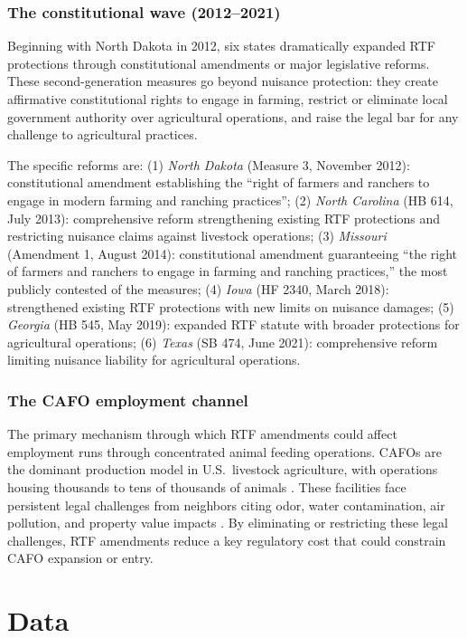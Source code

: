 \documentclass[12pt]{article}
\begin{document}
\subsubsection*{The constitutional wave (2012--2021)} Beginning with North Dakota in 2012, six states dramatically expanded RTF protections through constitutional amendments or major legislative reforms. These second-generation measures go beyond nuisance protection: they create affirmative constitutional rights to engage in farming, restrict or eliminate local government authority over agricultural operations, and raise the legal bar for any challenge to agricultural practices.

The specific reforms are: (1) \textit{North Dakota} (Measure 3, November 2012): constitutional amendment establishing the ``right of farmers and ranchers to engage in modern farming and ranching practices''; (2) \textit{North Carolina} (HB 614, July 2013): comprehensive reform strengthening existing RTF protections and restricting nuisance claims against livestock operations; (3) \textit{Missouri} (Amendment 1, August 2014): constitutional amendment guaranteeing ``the right of farmers and ranchers to engage in farming and ranching practices,'' the most publicly contested of the measures; (4) \textit{Iowa} (HF 2340, March 2018): strengthened existing RTF protections with new limits on nuisance damages; (5) \textit{Georgia} (HB 545, May 2019): expanded RTF statute with broader protections for agricultural operations; (6) \textit{Texas} (SB 474, June 2021): comprehensive reform limiting nuisance liability for agricultural operations.

\subsubsection*{The CAFO employment channel} The primary mechanism through which RTF amendments could affect employment runs through concentrated animal feeding operations. CAFOs are the dominant production model in U.S.\ livestock agriculture, with operations housing thousands to tens of thousands of animals \citep{macdonald2009}. These facilities face persistent legal challenges from neighbors citing odor, water contamination, air pollution, and property value impacts \citep{herriges2005, kim2009}. By eliminating or restricting these legal challenges, RTF amendments reduce a key regulatory cost that could constrain CAFO expansion or entry.


\section{Data}
\label{sec:data}
\end{document}

